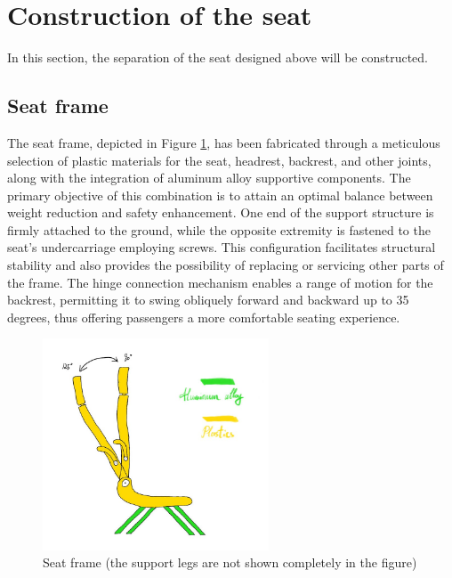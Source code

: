 \section{Construction of the seat} \label{sec:Constr}

In this section, the separation of the seat designed above will be constructed.

\subsection{Seat frame}
The seat frame, depicted in Figure \ref{fig:frame}, has been fabricated through a meticulous selection of plastic materials for the seat, headrest, backrest, and other joints, along with the integration of aluminum alloy supportive components. The primary objective of this combination is to attain an optimal balance between weight reduction and safety enhancement. One end of the support structure is firmly attached to the ground, while the opposite extremity is fastened to the seat's undercarriage employing screws. This configuration facilitates structural stability and also provides the possibility of replacing or servicing other parts of the frame. The hinge connection mechanism enables a range of motion for the backrest, permitting it to swing obliquely forward and backward up to 35 degrees, thus offering passengers a more comfortable seating experience.

\begin{figure}[!htp]
    \centering
    \includegraphics[width=0.6\textwidth]{images/Seat frame.jpg}
    \caption{Seat frame (the support legs are not shown completely in the figure)}
    \label{fig:frame}
\end{figure}


